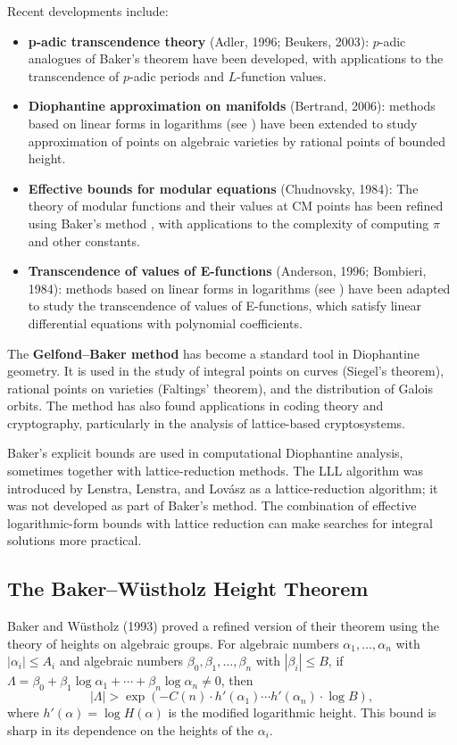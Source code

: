 Recent developments include:
\begin{itemize}
    \item \textbf{p-adic transcendence theory} (Adler, 1996; Beukers, 2003): $p$-adic analogues of Baker's theorem have been developed, with applications to the transcendence of $p$-adic periods and $L$-function values.
    \item \textbf{Diophantine approximation on manifolds} (Bertrand, 2006): methods based on linear forms in logarithms (see \cite{baker1966}) have been extended to study approximation of points on algebraic varieties by rational points of bounded height.
    \item \textbf{Effective bounds for modular equations} (Chudnovsky, 1984): The theory of modular functions and their values at CM points has been refined using Baker's method \cite{baker1966}, with applications to the complexity of computing $\pi$ and other constants.
    \item \textbf{Transcendence of values of E-functions} (Anderson, 1996; Bombieri, 1984): methods based on linear forms in logarithms (see \cite{baker1966}) have been adapted to study the transcendence of values of E-functions, which satisfy linear differential equations with polynomial coefficients.
\end{itemize}

The \textbf{Gelfond--Baker method} has become a standard tool in Diophantine geometry. It is used in the study of integral points on curves (Siegel's theorem), rational points on varieties (Faltings' theorem), and the distribution of Galois orbits. The method has also found applications in coding theory and cryptography, particularly in the analysis of lattice-based cryptosystems.

Baker's explicit bounds are used in computational Diophantine analysis, sometimes together with lattice-reduction methods. The LLL algorithm was introduced by Lenstra, Lenstra, and Lovász as a lattice-reduction algorithm; it was not developed as part of Baker's method. The combination of effective logarithmic-form bounds with lattice reduction can make searches for integral solutions more practical.

\subsection*{The Baker--W\"{u}stholz Height Theorem}

Baker and W\"{u}stholz (1993) proved a refined version of their theorem using the theory of heights on algebraic groups. For algebraic numbers $\alpha_1, \ldots, \alpha_n$ with $|\alpha_i| \leq A_i$ and algebraic numbers $\beta_0, \beta_1, \ldots, \beta_n$ with $|\beta_i| \leq B$, if $\Lambda = \beta_0 + \beta_1 \log \alpha_1 + \cdots + \beta_n \log \alpha_n \neq 0$, then
\[
|\Lambda| > \exp\left(-C(n) \cdot h'(\alpha_1) \cdots h'(\alpha_n) \cdot \log B\right),
\]
where $h'(\alpha) = \log H(\alpha)$ is the modified logarithmic height. This bound is sharp in its dependence on the heights of the $\alpha_i$.

